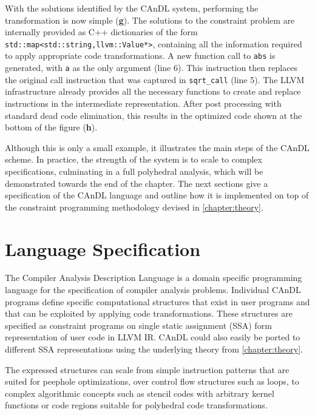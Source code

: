     With the solutions identified by the CAnDL system, performing the
    transformation is now simple ({\bf g}).
    The solutions to the constraint problem are internally provided as C++
    dictionaries of the form \texttt{std::map<std::string,llvm::Value*>},
    containing all the information required to apply appropriate code
    transformations.
    A new function call to \texttt{abs} is generated, with \texttt{a} as the
    only argument (line 6).
    This instruction then replaces the original call instruction that was
    captured in \texttt{sqrt\_call} (line 5).
    The LLVM infrastructure already provides all the necessary functions
    to create and replace instructions in the intermediate representation.
    After post processing with standard dead code elimination, this results in
    the optimized code shown at the bottom of the figure ({\bf h}).

    Although this is only a small example, it illustrates the main steps of the
    CAnDL scheme.
    In practice, the strength of the system is to scale to complex
    specifications, culminating in a full polyhedral analysis, which will be
    demonstrated towards the end of the chapter.
    The next sections give a specification of the CAnDL language and outline how
    it is implemented on top of the constraint programming methodology devised
    in \autoref{chapter:theory}.

\begin{figure}[p]
    
    \label{fig:candlexample}
\end{figure}

\section{Language Specification}

    The Compiler Analysis Description Language is a domain specific
    programming language for the specification of compiler analysis problems. 
    Individual CAnDL programs define specific computational structures that
    exist in user programs and that can be exploited by applying code
    transformations.
    These structures are specified as constraint programs on single static
    assignment (SSA) form representation of user code in LLVM IR.
    CAnDL could also easily be ported to different SSA representations using the
    underlying theory from \autoref{chapter:theory}.

    The expressed structures can scale from simple instruction patterns that are
    suited for peephole optimizations, over control flow structures such
    as loops, to complex algorithmic concepts such as stencil codes with
    arbitrary kernel functions or code regions suitable for polyhedral code
    transformations.

